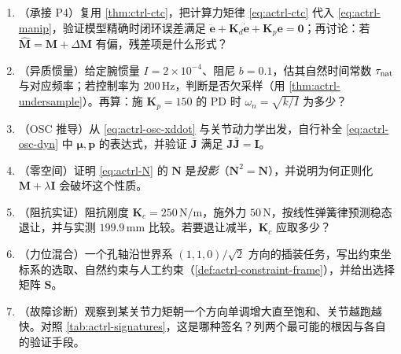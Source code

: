 \begin{practice}[练习]
\begin{enumerate}
  \item （承接 P4）复用 \cref{thm:ctrl-ctc}，把计算力矩律 \cref{eq:actrl-ctc} 代入 \cref{eq:actrl-manip}，验证模型精确时闭环误差满足 $\ddot{\mathbf{e}}+\mathbf{K}_d\dot{\mathbf{e}}+\mathbf{K}_p\mathbf{e}=\mathbf{0}$；再讨论：若 $\hat{\mathbf{M}}=\mathbf{M}+\Delta\mathbf{M}$ 有偏，残差项是什么形式？
  \item （异质惯量）给定腕惯量 $I=2\times10^{-4}$、阻尼 $b=0.1$，估其自然时间常数 $\tau_{\rm nat}$ 与对应频率；若控制率为 $200\,\mathrm{Hz}$，判断是否欠采样（用 \cref{thm:actrl-undersample}）。再算：施 $\mathbf{K}_p=150$ 的 PD 时 $\omega_n=\sqrt{k/I}$ 为多少？
  \item （OSC 推导）从 \cref{eq:actrl-osc-xddot} 与关节动力学出发，自行补全 \cref{eq:actrl-osc-dyn} 中 $\boldsymbol{\mu},\mathbf{p}$ 的表达式，并验证 $\bar{\mathbf{J}}$ 满足 $\mathbf{J}\bar{\mathbf{J}}=\mathbf{I}$。
  \item （零空间）证明 \cref{eq:actrl-N} 的 $\mathbf{N}$ 是\emph{投影}（$\mathbf{N}^2=\mathbf{N}$），并说明为何正则化 $\mathbf{M}+\lambda\mathbf{I}$ 会破坏这个性质。
  \item （阻抗实证）阻抗刚度 $\mathbf{K}_c=250\,\mathrm{N/m}$，施外力 $50\,\mathrm{N}$，按线性弹簧律预测稳态退让，并与实测 $199.9\,\mathrm{mm}$ 比较。若要退让减半，$\mathbf{K}_c$ 应取多少？
  \item （力位混合）一个孔轴沿世界系 $(1,1,0)/\sqrt{2}$ 方向的插装任务，写出约束坐标系的选取、自然约束与人工约束（\cref{def:actrl-constraint-frame}），并给出选择矩阵 $\mathbf{S}$。
  \item （故障诊断）观察到某关节力矩朝一个方向单调增大直至饱和、关节越跑越快。对照 \cref{tab:actrl-signatures}，这是哪种签名？列两个最可能的根因与各自的验证手段。
\end{enumerate}
\end{practice}
